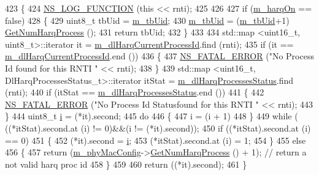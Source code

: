 \begin{DoxyCode}
423 \{
424   \hyperlink{log-macros-disabled_8h_a90b90d5bad1f39cb1b64923ea94c0761}{NS\_LOG\_FUNCTION} (\textcolor{keyword}{this} << rnti);
425 
426 
427   \textcolor{keywordflow}{if} (\hyperlink{classns3_1_1MmWaveRrMacScheduler_ad8bb79b5853000b363b42a158633a942}{m\_harqOn} == \textcolor{keyword}{false})
428     \{
429                 uint8\_t tbUid = \hyperlink{classns3_1_1MmWaveRrMacScheduler_a379f6c5cc3404d41c4082879498fc38b}{m\_tbUid};
430                 \hyperlink{classns3_1_1MmWaveRrMacScheduler_a379f6c5cc3404d41c4082879498fc38b}{m\_tbUid} = (\hyperlink{classns3_1_1MmWaveRrMacScheduler_a379f6c5cc3404d41c4082879498fc38b}{m\_tbUid}+1) %
      \hyperlink{classns3_1_1MmWavePhyMacCommon_a40773d84172ebeb5aff125f56ebcc5ac}{GetNumHarqProcess} ();
431       \textcolor{keywordflow}{return} tbUid;
432     \}
433 
434   std::map <uint16\_t, uint8\_t>::iterator it = \hyperlink{classns3_1_1MmWaveRrMacScheduler_a6ff50e3af4095ffc47155de7d30c8d6d}{m\_dlHarqCurrentProcessId}.find (rnti);
435   \textcolor{keywordflow}{if} (it == \hyperlink{classns3_1_1MmWaveRrMacScheduler_a6ff50e3af4095ffc47155de7d30c8d6d}{m\_dlHarqCurrentProcessId}.end ())
436     \{
437       \hyperlink{group__fatal_ga5131d5e3f75d7d4cbfd706ac456fdc85}{NS\_FATAL\_ERROR} (\textcolor{stringliteral}{"No Process Id found for this RNTI "} << rnti);
438     \}
439   std::map <uint16\_t, DlHarqProcessesStatus\_t>::iterator itStat = 
      \hyperlink{classns3_1_1MmWaveRrMacScheduler_a5734289010d38bd8dfe04ed50ba99936}{m\_dlHarqProcessesStatus}.find (rnti);
440   \textcolor{keywordflow}{if} (itStat == \hyperlink{classns3_1_1MmWaveRrMacScheduler_a5734289010d38bd8dfe04ed50ba99936}{m\_dlHarqProcessesStatus}.end ())
441     \{
442       \hyperlink{group__fatal_ga5131d5e3f75d7d4cbfd706ac456fdc85}{NS\_FATAL\_ERROR} (\textcolor{stringliteral}{"No Process Id Statusfound for this RNTI "} << rnti);
443     \}
444   uint8\_t \hyperlink{bernuolliDistribution_8m_a6f6ccfcf58b31cb6412107d9d5281426}{i} = (*it).second;
445   \textcolor{keywordflow}{do}
446     \{
447       i = (i + 1) %
448     \}
449   \textcolor{keywordflow}{while} ( ((*itStat).second.at (i) != 0)&&(i != (*it).second));
450   \textcolor{keywordflow}{if} ((*itStat).second.at (i) == 0)
451     \{
452       (*it).second = \hyperlink{bernuolliDistribution_8m_a6f6ccfcf58b31cb6412107d9d5281426}{i};
453       (*itStat).second.at (i) = 1;
454     \}
455   \textcolor{keywordflow}{else}
456     \{
457       \textcolor{keywordflow}{return} (\hyperlink{classns3_1_1MmWaveMacScheduler_a24d7af4971d2e500fe543cefbafa2fd9}{m\_phyMacConfig}->\hyperlink{classns3_1_1MmWavePhyMacCommon_a40773d84172ebeb5aff125f56ebcc5ac}{GetNumHarqProcess} () + 1); \textcolor{comment}{// return a not
       valid harq proc id}
458     \}
459 
460   \textcolor{keywordflow}{return} ((*it).second);
461 \}
\end{DoxyCode}


